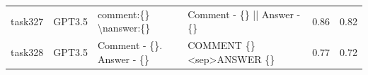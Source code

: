 \begin{longtable}{@{}p{0.8cm\tiny}p{1cm\tiny}p{4.1cm\ttfamily\tiny}p{4.1cm\ttfamily\tiny}p{0.8cm\tiny}p{0.8cm\tiny}@{}}
task327   & GPT3.5    & comment:\{\} \textbackslash{}nanswer:\{\}                                                                                                                                                                                                                                                                                                                                                                                                                                                                               & Comment - \{\} || Answer - \{\}                                                                                                                                                                                                                                                                                                                                                                                                                                                                                                                                                   & 0.86 & 0.82 \\
task328   & GPT3.5    & Comment - \{\}. Answer - \{\}                                                                                                                                                                                                                                                                                                                                                                                                                                                                                           & COMMENT \{\} \textless{}sep\textgreater ANSWER \{\}                                                                                                                                                                                                                                                                                                                                                                                                                                                                                                                               & 0.77 & 0.72 \\

\end{longtable}
